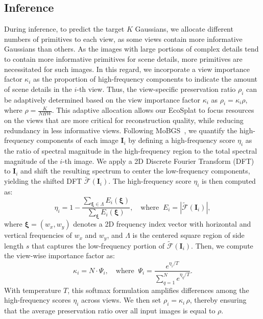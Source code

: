 \subsection{Inference}
\label{sec:inference}
During inference, to predict the target $K$ Gaussians, we allocate different numbers of primitives to each view, as some views contain more informative Gaussians than others. As the images with large portions of complex details tend to contain more informative primitives for scene details, more primitives are necessitated for such images. In this regard, we incorporate a view importance factor $\kappa_i$ as the proportion of high-frequency components to indicate the amount of scene details in the $i$-th view.
Thus, the view-specific preservation ratio $\rho_i$ can be adaptively determined based on the view importance factor $\kappa_i$ as $\rho_i = \kappa_i \rho$, where $\rho = \frac{K}{NHW}$.
This adaptive allocation allows our EcoSplat to focus resources on the views that are more critical for reconstruction quality, while reducing redundancy in less informative views.
Following MoBGS~\cite{bui2025mobgsmotiondeblurringdynamic}, we quantify the high-frequency components of each image $\bm{I}_i$ by defining a high-frequency score $\eta_i$ as the ratio of spectral magnitude in the high-frequency region to the total spectral magnitude of the $i$-th image.
We apply a 2D Discrete Fourier Transform (DFT) to $\bm{I}_i$ and shift the resulting spectrum to center the low-frequency components, yielding the shifted DFT $\tilde{\mathcal{F}}(\bm{I}_i)$.
The high-frequency score $\eta_i$ is then computed as:
\begin{equation}
    \eta_i = 1 - \frac{\sum_{\bm{\xi} \in \Lambda} E_i(\bm{\xi})}{\sum_{\bm{\xi}} E_i(\bm{\xi})},
    \quad \text{where} \;\; E_i = |\tilde{\mathcal{F}}(\bm{I}_i)|,
\label{eq:high_frequency_score}
\end{equation}
where $\bm{\xi} = (w_x,w_y)$ denotes a 2D frequency index vector with horizontal and vertical frequencies of $w_x$ and $w_y$, and $\Lambda$ is the centered square region of side length $s$ that captures the low-frequency portion of $\tilde{\mathcal{F}}(\bm{I}_i)$.
Then, we compute the view-wise importance factor as:
\begin{equation}
    \kappa_i = N\cdot\Psi_i, \quad \text{where}  \;\; \Psi_i = \frac{e^{\eta_i / T}}{\sum_{q=1}^{N} e^{\eta_q / T}}.
\label{eq:view_wise_impotance_factor}
\end{equation}
With temperature $T$, this softmax formulation amplifies differences among the high-frequency scores $\eta_i$ across views.
We then set $\rho_i = \kappa_i\,\rho$, thereby ensuring that the average preservation ratio over all input images is equal to $\rho$.